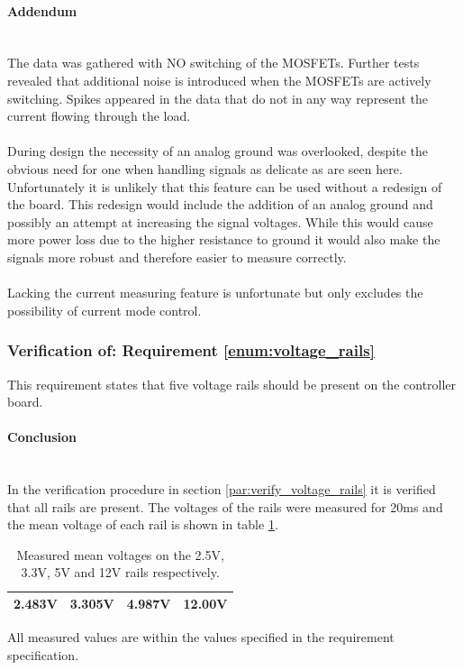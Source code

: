 \paragraph{Addendum}~\\
The data was gathered with NO switching of the MOSFETs.
Further tests revealed that additional noise is introduced when the MOSFETs are actively switching.
Spikes appeared in the data that do not in any way represent the current flowing through the load.
\\~\\
During design the necessity of an analog ground was overlooked, despite the obvious need for one when handling signals as delicate as are seen here.
Unfortunately it is unlikely that this feature can be used without a redesign of the board.
This redesign would include the addition of an analog ground and possibly an attempt at increasing the signal voltages.
While this would cause more power loss due to the higher resistance to ground it would also make the signals more robust and therefore easier to measure correctly.
\\~\\
Lacking the current measuring feature is unfortunate but only excludes the possibility of current mode control.

\subsubsection{Verification of: Requirement \ref{enum:voltage_rails}} %
\label{ssub:requirement_enum:voltage_rails}
This requirement states that five voltage rails should be present on the controller board. 

\paragraph{Conclusion}~\\
In the verification procedure in section \ref{par:verify_voltage_rails} it is verified that all rails are present.
The voltages of the rails were measured for 20ms and the mean voltage of each rail is shown in table \ref{tab:meas_rails}.
\begin{table}[]
\centering
\begin{tabular}{|l|l|l|l|}
\hline
2.483V & 3.305V & 4.987V & 12.00V \\
\hline
\end{tabular}
\caption[Measured mean voltages on the rails.]{Measured mean voltages on the 2.5V, 3.3V, 5V and 12V rails respectively.}
\label{tab:meas_rails}
\end{table}
All measured values are within the values specified in the requirement specification.


